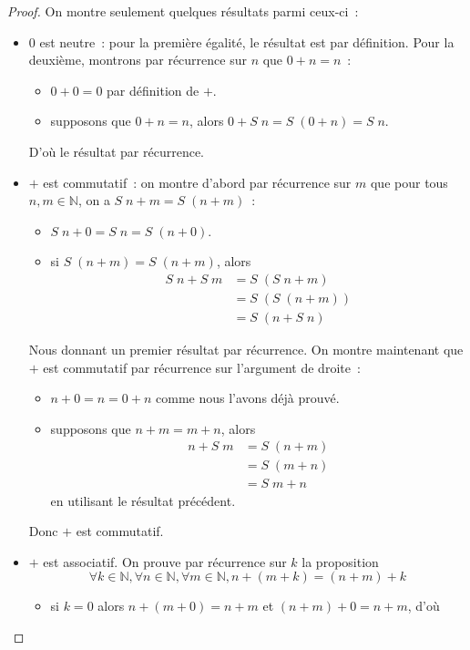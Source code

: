 \begin{proof}
  On montre seulement quelques résultats parmi ceux-ci~:
  \begin{itemize}
  \item $0$ est neutre~: pour la première égalité, le résultat est par
    définition. Pour la deuxième, montrons par récurrence sur $n$ que
    $0+n = n$~:
    \begin{itemize}
    \item $0 + 0 = 0$ par définition de $+$.
    \item supposons que $0+n = n$, alors $0+S\;n = S\;(0+n) = S\;n$.
    \end{itemize}
    D'où le résultat par récurrence.
  \item $+$ est commutatif~: on montre d'abord par récurrence sur $m$ que pour
    tous $n,m\in\mathbb N$, on a $S\;n+m = S\;(n+m)$~:
    \begin{itemize}
    \item $S\;n+0=S\;n = S\;(n+0)$.
    \item si $S\;(n+m) = S\;(n+m)$, alors
      \begin{align*}
        S\;n+S\;m &= S\;(S\;n+m)\\
        &= S\;(S\;(n+m))\\
        &= S\;(n+S\;n)
      \end{align*}
    \end{itemize}
    Nous donnant un premier résultat par récurrence. On montre maintenant que
    $+$ est commutatif par récurrence sur l'argument de droite~:
    \begin{itemize}
    \item $n+0 = n = 0+n$ comme nous l'avons déjà prouvé.
    \item supposons que $n+m = m+n$, alors
      \begin{align*}
        n + S\;m &= S\;(n+m)\\
        &= S\;(m+n)\\
        &= S\;m + n
      \end{align*}
      en utilisant le résultat précédent.
    \end{itemize}
    Donc $+$ est commutatif.
  \item $+$ est associatif. On prouve par récurrence sur $k$ la proposition
    \[\forall k\in\mathbb N,\forall n\in\mathbb N,\forall m\in \mathbb N,
    n + (m + k) = (n + m) + k\]
    \begin{itemize}
    \item si $k = 0$ alors $n + (m + 0) = n + m$ et $(n+m)+0=n+m$, d'où

\end{itemize}
\end{itemize}
\end{proof}
